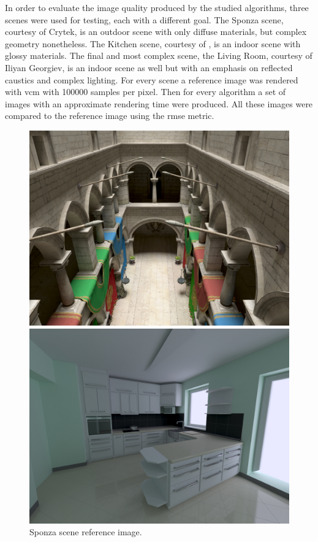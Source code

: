 In order to evaluate the image quality produced by the studied algorithms, three scenes were used for testing, each with a different goal. The Sponza scene, courtesy of Crytek, is an outdoor scene with only diffuse materials, but complex geometry nonetheless. The Kitchen scene, courtesy of , is an indoor scene with glossy materials. The final and most complex scene, the Living Room, courtesy of Iliyan Georgiev, is an indoor scene as well but with an emphasis on reflected caustics and complex lighting. For every scene a reference image was rendered with \gls{vcm} with 100000 samples per pixel. Then for every algorithm a set of images with an approximate rendering time were produced. All these images were compared to the reference image using the \gls{rmse} metric.

\begin{figure}[h]
\centering
\begin{minipage}[b]{0.3\linewidth}
\includegraphics[width=\linewidth]{img/sponza_ref.jpg}
\caption{\label{img:sponza_ref} Sponza scene reference image.}
\end{minipage}
\quad
\begin{minipage}[b]{0.3\linewidth}
\includegraphics[width=\linewidth]{img/kitchen_ref.jpg}

\end{minipage}
\end{figure}
